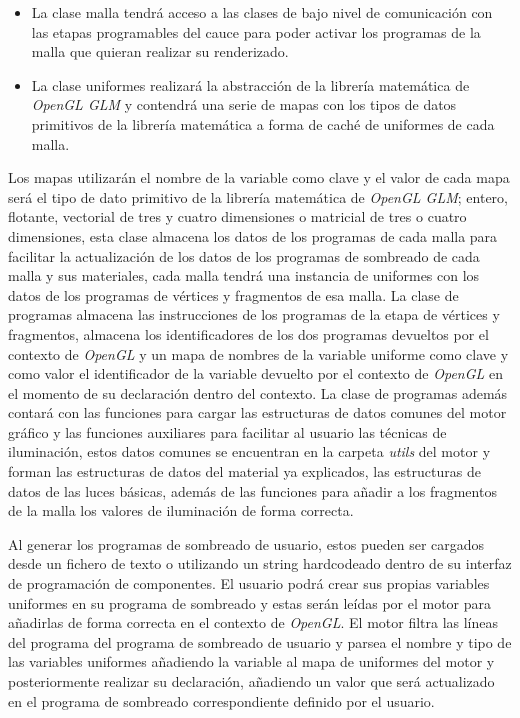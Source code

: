 \documentclass[a4paper]{book}
\begin{document}
\begin{itemize}

\item La clase malla tendrá acceso a las clases de bajo nivel de comunicación con las etapas programables del cauce para poder activar los programas
de la malla que quieran realizar su renderizado.

\item La clase uniformes realizará la abstracción de la librería matemática de \textit{OpenGL GLM} y contendrá una serie de
mapas con los tipos de datos primitivos de la librería matemática a forma de caché de uniformes de cada malla.

\end{itemize}

Los mapas utilizarán el nombre de la variable como clave y el valor de cada mapa será el tipo de dato primitivo de la librería matemática
de \textit{OpenGL GLM}; entero, flotante, vectorial de tres y cuatro dimensiones o matricial de tres o cuatro dimensiones, esta clase almacena
los datos de los programas de cada malla para facilitar la actualización de los datos de los programas de sombreado de cada malla y sus 
materiales, cada malla tendrá una instancia de uniformes con los datos de los programas de vértices y fragmentos de esa malla. La clase de programas
almacena las instrucciones de los programas de la etapa de vértices y fragmentos, almacena los identificadores de los dos programas devueltos por
el contexto de \textit{OpenGL} y un mapa de nombres de la variable uniforme como clave y como valor el identificador de la variable devuelto por
el contexto de \textit{OpenGL} en el momento de su declaración dentro del contexto. La
clase de programas además contará con las funciones para cargar las estructuras de datos comunes del motor gráfico y las funciones auxiliares para
facilitar al usuario las técnicas de iluminación, estos datos comunes se encuentran en la carpeta \textit{utils} del motor y forman las estructuras de
datos del material ya explicados, las estructuras de datos de las luces básicas, además de las funciones para añadir a los fragmentos de la malla
los valores de iluminación de forma correcta.

Al generar los programas de sombreado de usuario, estos pueden ser cargados desde un fichero de texto o utilizando un string hardcodeado
dentro de su interfaz de programación de componentes. El usuario podrá crear sus propias variables uniformes en
su programa de sombreado y estas serán leídas por el motor para añadirlas de forma correcta en el contexto de \textit{OpenGL}. El motor filtra las
líneas del programa del programa de sombreado de usuario y parsea el nombre y tipo de las variables uniformes añadiendo la variable al mapa de uniformes
del motor y posteriormente realizar su declaración, añadiendo un valor que será actualizado en el programa de sombreado correspondiente definido por
el usuario.
\end{document}
